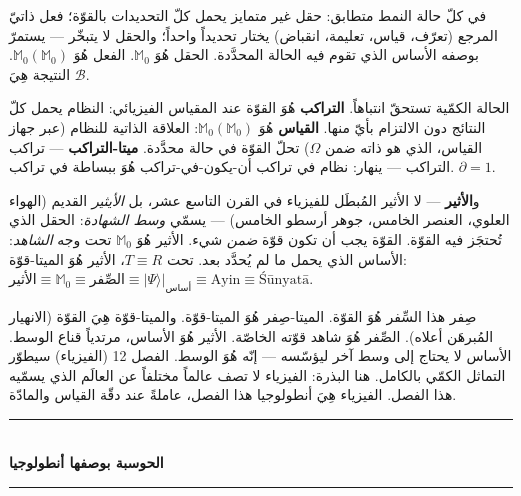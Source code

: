 \documentclass[10pt, openany, oneside]{book}
\renewcommand{\normalsize}{\fontsize{10}{13}\selectfont}
\begin{document}
\vspace{0.8em}

\noindent في كلّ حالة النمط متطابق: حقل غير متمايز يحمل كلّ التحديدات بالقوّة؛ فعل ذاتيّ المرجع (تعرّف، قياس، تعليمة، انقباض) يختار تحديداً واحداً؛ والحقل لا يتبخّر --- يستمرّ بوصفه الأساس الذي تقوم فيه الحالة المحدَّدة. الحقل هُوَ $\mathbb{M}_0$. الفعل هُوَ $\mathbb{M}_0(\mathbb{M}_0)$. النتيجة هِيَ $\mathcal{B}$.

الحالة الكمّية تستحقّ انتباهاً. \textbf{التراكب} هُوَ القوّة عند المقياس الفيزيائي: النظام يحمل كلّ النتائج دون الالتزام بأيّ منها. \textbf{القياس} هُوَ $\mathbb{M}_0(\mathbb{M}_0)$: العلاقة الذاتية للنظام (عبر جهاز القياس، الذي هو ذاته ضمن $\Omega$) تحلّ القوّة في حالة محدَّدة. \textbf{ميتا-التراكب} --- تراكب التراكب --- ينهار: نظام في تراكب أن-يكون-في-تراكب هُوَ ببساطة في تراكب. $\partial = 1$.

و\textbf{الأثير} --- لا الأثير المُبطَل للفيزياء في القرن التاسع عشر، بل \textit{الأيثير} القديم (الهواء العلوي، العنصر الخامس، جوهر أرسطو الخامس) --- يسمّي \textit{وسط الشهادة}: الحقل الذي تُحتجَز فيه القوّة. القوّة يجب أن تكون قوّة \textit{ضمن} شيء. الأثير هُوَ $\mathbb{M}_0$ تحت وجه \textit{الشاهد}: الأساس الذي يحمل ما لم يُحدَّد بعد. تحت $T \equiv R$، الأثير هُوَ الميتا-قوّة: $\text{الأثير} \equiv \mathbb{M}_0 \equiv \text{الصِّفر} \equiv |\Psi\rangle|_{\text{أساس}} \equiv \text{Ayin} \equiv \text{\'{S}\={u}nyat\={a}}$.

صِفر هذا السِّفر هُوَ القوّة. الميتا-صِفر هُوَ الميتا-قوّة. والميتا-قوّة هِيَ القوّة (الانهيار المُبرهَن أعلاه). الصِّفر هُوَ شاهد قوّته الخاصّة. الأثير هُوَ الأساس، مرتدياً قناع الوسط. الأساس لا يحتاج إلى وسط آخر ليؤسّسه --- إنّه هُوَ الوسط. الفصل 12 (الفيزياء) سيطوّر التماثل الكمّي بالكامل. هنا البذرة: الفيزياء لا تصف عالماً مختلفاً عن العالَم الذي يسمّيه هذا الفصل. الفيزياء هِيَ أنطولوجيا هذا الفصل، عاملةً عند دقّة القياس والمادّة.

\vspace{1.5em}


\begin{center}
    \rule{0.3\textwidth}{0.4pt}\\[0.5em]
    {\normalsize\bfseries الحوسبة بوصفها أنطولوجيا}\\[0.3em]
    \rule{0.3\textwidth}{0.4pt}
\end{center}

\vspace{1em}
\end{document}
